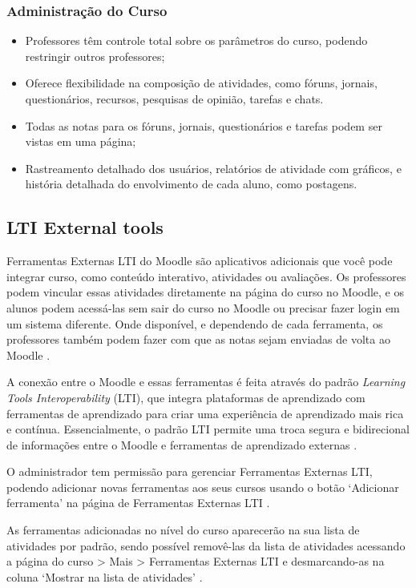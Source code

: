 \subsubsection{Administração do Curso}

\begin{itemize}
    \item Professores têm controle total sobre os parâmetros do curso, podendo restringir outros professores;
    \item Oferece flexibilidade na composição de atividades, como fóruns, jornais, questionários, recursos, pesquisas de opinião, tarefas e chats. 
    \item Todas as notas para os fóruns, jornais, questionários e tarefas podem ser vistas em uma página;
    \item Rastreamento detalhado dos usuários, relatórios de atividade com gráficos, e história detalhada do envolvimento de cada aluno, como postagens.
\end{itemize}

\subsection{LTI External tools}

Ferramentas Externas LTI do Moodle são aplicativos adicionais que você pode integrar curso, como conteúdo interativo, atividades ou avaliações. Os professores podem vincular essas atividades diretamente na página do curso no Moodle, e os alunos podem acessá-las sem sair do curso no Moodle ou precisar fazer login em um sistema diferente. Onde disponível, e dependendo de cada ferramenta, os professores também podem fazer com que as notas sejam enviadas de volta ao Moodle \cite{moodle}.

A conexão entre o Moodle e essas ferramentas é feita através do padrão \textit{Learning Tools Interoperability} (LTI), que integra plataformas de aprendizado com ferramentas de aprendizado para criar uma experiência de aprendizado mais rica e contínua. Essencialmente, o padrão LTI permite uma troca segura e bidirecional de informações entre o Moodle e ferramentas de aprendizado externas \cite{moodle}. 

O administrador tem permissão para gerenciar Ferramentas Externas LTI, podendo adicionar novas ferramentas aos seus cursos usando o botão ‘Adicionar ferramenta’ na página de Ferramentas Externas LTI \cite{moodle}.

As ferramentas adicionadas no nível do curso aparecerão na sua lista de atividades por padrão, sendo possível removê-las da lista de atividades acessando a página do curso > Mais > Ferramentas Externas LTI e desmarcando-as na coluna ‘Mostrar na lista de atividades’ \cite{moodle}.

